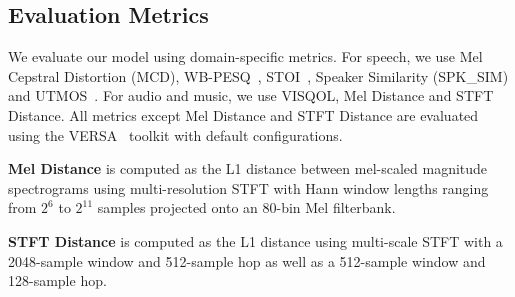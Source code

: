 \documentclass[11pt]{article}
\begin{document}

\subsection{Evaluation Metrics}

We evaluate our model using domain-specific metrics. For speech, we use Mel Cepstral Distortion (MCD), WB-PESQ~\cite{rix2001perceptual}, STOI~\cite{taal2010short}, Speaker Similarity (SPK\_SIM)\cite{jung2024espnet} and UTMOS~\cite{saeki2022utmos}. For audio and music, we use VISQOL\cite{hines2015visqol}, Mel Distance and STFT Distance. All metrics except Mel Distance and STFT Distance are evaluated using the VERSA~\cite{shi2024versa} toolkit with default configurations.

\noindent\textbf{Mel Distance} is computed as the L1 distance between mel-scaled magnitude spectrograms using multi-resolution STFT with Hann window lengths ranging from $2^6$ to $2^{11}$ samples projected onto an 80-bin Mel filterbank.

\noindent\textbf{STFT Distance} is computed as the L1 distance using multi-scale STFT with a 2048-sample window and 512-sample hop as well as a 512-sample window and 128-sample hop.

\end{document}
